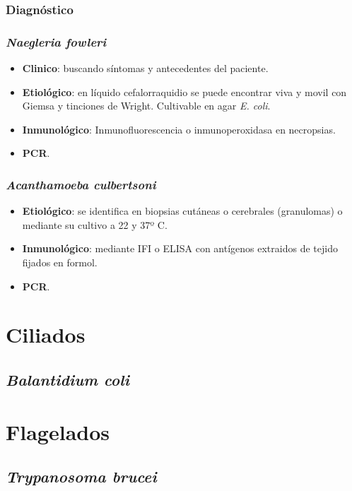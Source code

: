 \documentclass[10pt,a4paper,onecolumn,openany]{book}
\begin{document}
\subsubsection{Diagnóstico}
\begin{multicols}{2}
	\subsubsection{\textit{Naegleria fowleri}}
	\begin{itemize}[itemsep=0pt,parsep=0pt,topsep=0pt,partopsep=0pt]
		\item\textbf{Clinico}: buscando síntomas y antecedentes del paciente.
		\item\textbf{Etiológico}: en líquido cefalorraquidio se puede encontrar viva y movil con Giemsa y tinciones de Wright. Cultivable en agar \textit{E. coli}.
		\item\textbf{Inmunológico}: Inmunofluorescencia o inmunoperoxidasa en necropsias.
		\item\textbf{PCR}.
	\end{itemize}
	\columnbreak
	\subsubsection{\textit{Acanthamoeba culbertsoni}}
	\begin{itemize}[itemsep=0pt,parsep=0pt,topsep=0pt,partopsep=0pt]
		\item\textbf{Etiológico}: se identifica en biopsias cutáneas o cerebrales (granulomas) o mediante su cultivo a 22 y 37º C.
		\item\textbf{Inmunológico}: mediante IFI o ELISA con antígenos extraidos de tejido fijados en formol.
		\item\textbf{PCR}.
	\end{itemize}
\end{multicols}
\newpage
\section{Ciliados}
\subsection{\textit{Balantidium coli}}
\section{Flagelados}
\subsection{\textit{Trypanosoma brucei}}
\end{document}
